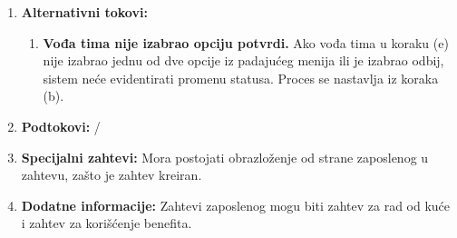 \documentclass[a4paper]{article}
\begin{document}
\begin{enumerate}
\begin{enumerate}
        \end{enumerate}
    \item \textbf{Alternativni tokovi:}
        \begin{enumerate}
            \item \textbf{Vođa tima nije izabrao opciju potvrdi.} Ako vođa tima u koraku (e) nije izabrao jednu od dve opcije iz padajućeg menija ili je izabrao odbij, sistem neće evidentirati promenu statusa. Proces se nastavlja iz koraka (b).
        \end{enumerate}
    \item \textbf{Podtokovi:} /
    \item \textbf{Specijalni zahtevi:} Mora postojati obrazloženje od strane zaposlenog u zahtevu, zašto je zahtev kreiran.
    \item \textbf{Dodatne informacije:} Zahtevi zaposlenog mogu biti zahtev za rad od kuće i zahtev za korišćenje benefita.
\end{enumerate}
\end{document}
